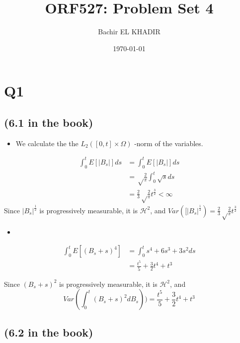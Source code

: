 \documentclass[11pt]{article}
\author{Bachir EL KHADIR}
\date{\today}
\title{ORF527: Problem Set 4}
\begin{document}
\maketitle

\section*{Q1}
\label{sec:orgheadline4}
\subsection*{(6.1 in the book)}
\label{sec:orgheadline1}

\begin{itemize}
\item We calculate the the \(L_2([0, t] \times \Omega)\) -norm of the variables.
\end{itemize}
\begin{align*}
\int_0^t E[|B_s|] ds &= \int_0^t E[|B_s|] ds
\\ &= \sqrt \frac{2}{\pi} \int_0^t \sqrt{s} ds
\\ &= \frac{2}{3} \sqrt \frac{2}{\pi} t^{\frac{3}{2}} < \infty
\end{align*}
Since \(|B_s|^{\frac12}\) is progressively measurable, it is \(\mathcal H^2\), and
\(Var([|B_s|^{\frac12}) = \frac{2}{3} \sqrt \frac{2}{\pi} t^{\frac{3}{2}}\)

\begin{itemize}
\item 
\end{itemize}
\begin{align*}
 \int_0^t E[(B_s + s)^4]
&= \int_0^t s^4 + 6 s^3 + 3s^2 ds
\\&= \frac{t^5}{5} + \frac{3}{2} t^4 + t^3 
\end{align*}

Since \((B_s + s)^2\) is progressively measurable, it is \(\mathcal H^2\), and
 $$Var(\int_0^t (B_s + s)^2 dB_s)) =\frac{t^5}{5} + \frac{3}{2} t^4 + t^3$$




\subsection*{(6.2 in the book)}
\label{sec:orgheadline2}
\end{document}

